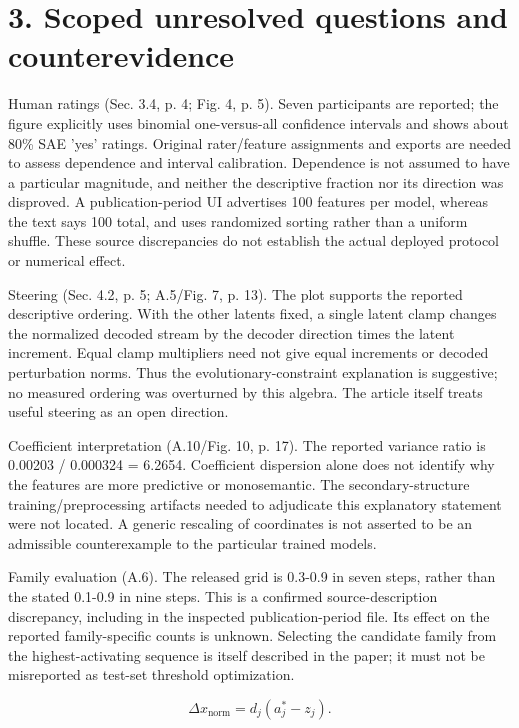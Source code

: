 \documentclass[10pt]{article}
\begin{document}
\section*{3. Scoped unresolved questions and counterevidence}
Human ratings (Sec. 3.4, p. 4; Fig. 4, p. 5). Seven participants are reported; the figure explicitly uses binomial one-versus-all confidence intervals and shows about 80\% SAE ’yes’ ratings. Original rater/feature assignments and exports are needed to assess dependence and interval calibration. Dependence is not assumed to have a particular magnitude, and neither the descriptive fraction nor its direction was disproved. A publication-period UI advertises 100 features per model, whereas the text says 100 total, and uses randomized sorting rather than a uniform shuffle. These source discrepancies do not establish the actual deployed protocol or numerical effect.\par
Steering (Sec. 4.2, p. 5; A.5/Fig. 7, p. 13). The plot supports the reported descriptive ordering. With the other latents fixed, a single latent clamp changes the normalized decoded stream by the decoder direction times the latent increment. Equal clamp multipliers need not give equal increments or decoded perturbation norms. Thus the evolutionary-constraint explanation is suggestive; no measured ordering was overturned by this algebra. The article itself treats useful steering as an open direction.\par
Coefficient interpretation (A.10/Fig. 10, p. 17). The reported variance ratio is 0.00203 / 0.000324 = 6.2654. Coefficient dispersion alone does not identify why the features are more predictive or monosemantic. The secondary-structure training/preprocessing artifacts needed to adjudicate this explanatory statement were not located. A generic rescaling of coordinates is not asserted to be an admissible counterexample to the particular trained models.\par
Family evaluation (A.6). The released grid is 0.3-0.9 in seven steps, rather than the stated 0.1-0.9 in nine steps. This is a confirmed source-description discrepancy, including in the inspected publication-period file. Its effect on the reported family-specific counts is unknown. Selecting the candidate family from the highest-activating sequence is itself described in the paper; it must not be misreported as test-set threshold optimization.\par
\[\Delta x_{\mathrm{norm}}=d_j(a_j^{*}-z_j).\]\par
\end{document}
